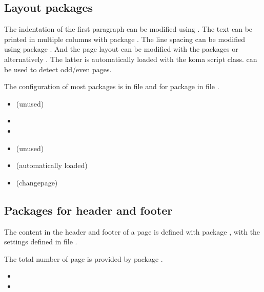 
\subsection{Layout packages}

The indentation of the first paragraph can be modified using . The text can be printed in multiple columns with package . The line spacing can be modified using package 
. And the page layout can be modified with the packages  or alternatively . The latter is automatically loaded with the koma script class.  can be used to detect odd/even pages.

The configuration of most packages is in file  and 
for package  in file .


\begin{itemize}[noitemsep]
\item {} (unused)
\item {}
\item {}
\item {} (unused)
\item {} (automatically loaded)
\item {} (changepage)
\end{itemize}


\subsection{Packages for header and footer}

The content in the header and footer of a page is defined with package 
, with the settings defined in file 
.

The total number of page is provided by package .

\begin{itemize}[noitemsep]
\item {}
\item {}
\end{itemize}

